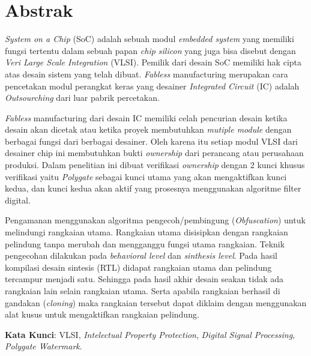 \chapter*{Abstrak}

\noindent \textit{System on a Chip} (SoC) adalah sebuah modul \textit{embedded system} yang
memiliki fungsi tertentu dalam sebuah papan \textit{chip silicon} yang juga bisa disebut
dengan \textit{Veri Large Scale Integration} (VLSI). Pemilik dari desain SoC memiliki
hak cipta atas desain sistem yang telah dibuat. \textit{Fabless} manufacturing merupakan
cara pencetakan modul perangkat keras yang desainer \textit{Integrated Circuit} (IC)
adalah \textit{Outsourching} dari luar pabrik percetakan.

\vspace*{0.5cm}
\noindent \textit{Fabless} manufacturing dari desain IC memiliki celah pencurian desain
ketika desain akan dicetak atau ketika proyek membutuhkan \textit{mutiple module}
dengan berbagai fungsi dari berbagai desainer. Oleh karena itu setiap modul VLSI
dari desainer chip ini membutuhkan bukti \textit{ownership} dari perancang atau
perusahaan produksi. Dalam penelitian ini dibuat verifikasi \textit{ownership}
dengan 2 kunci khusus verifikasi yaitu \textit{Polygate} sebagai kunci utama yang akan
mengaktifkan kunci kedua, dan kunci kedua akan aktif yang prosesnya
menggunakan algoritme filter digital.

\vspace*{0.5cm}
\noindent Pengamanan menggunakan algoritma pengecoh/pembingung (\textit{Obfuscation}) untuk melindungi rangkaian utama. Rangkaian utama disisipkan dengan rangkaian pelindung tanpa merubah dan mengganggu fungsi utama rangkaian. Teknik pengecohan dilakukan pada \textit{behavioral level} dan \textit{sinthesis level}. Pada hasil kompilasi desain sintesis (RTL) didapat rangkaian utama dan pelindung tercampur menjadi satu. Sehingga pada hasil akhir desain seakan tidak ada rangkaian lain selain rangkaian utama. Serta apabila rangkaian berhasil di gandakan (\textit{cloning}) maka rangkaian tersebut dapat diklaim dengan menggunakan alat kusus untuk mengaktifkan rangkaian pelindung.

\vspace*{0.5cm}

\noindent \textbf{Kata Kunci}: VLSI, \textit{Intelectual Property Protection}, \textit{Digital Signal Processing}, \textit{Polygate Watermark}.

\newpage